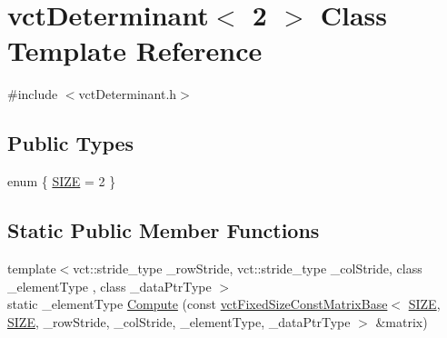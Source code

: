 \hypertarget{classvct_determinant_3_012_01_4}{\section{vct\-Determinant$<$ 2 $>$ Class Template Reference}
\label{classvct_determinant_3_012_01_4}
}


{\ttfamily \#include $<$vct\-Determinant.\-h$>$}

\subsection*{Public Types}
\begin{DoxyCompactItemize}
\item 
enum \{ \hyperlink{classvct_determinant_3_012_01_4_a9ed8f323cd2bc515f76a07c1eb7d7544aa4cda1b4da18f6d4c50329a98c60b934}{S\-I\-Z\-E} = 2
 \}
\end{DoxyCompactItemize}
\subsection*{Static Public Member Functions}
\begin{DoxyCompactItemize}
\item 
{\footnotesize template$<$vct\-::stride\-\_\-type \-\_\-row\-Stride, vct\-::stride\-\_\-type \-\_\-col\-Stride, class \-\_\-element\-Type , class \-\_\-data\-Ptr\-Type $>$ }\\static \-\_\-element\-Type \hyperlink{classvct_determinant_3_012_01_4_a2227410e9681c9649b728671fd9babbf}{Compute} (const \hyperlink{classvct_fixed_size_const_matrix_base}{vct\-Fixed\-Size\-Const\-Matrix\-Base}$<$ \hyperlink{classvct_determinant_3_012_01_4_a9ed8f323cd2bc515f76a07c1eb7d7544aa4cda1b4da18f6d4c50329a98c60b934}{S\-I\-Z\-E}, \hyperlink{classvct_determinant_3_012_01_4_a9ed8f323cd2bc515f76a07c1eb7d7544aa4cda1b4da18f6d4c50329a98c60b934}{S\-I\-Z\-E}, \-\_\-row\-Stride, \-\_\-col\-Stride, \-\_\-element\-Type, \-\_\-data\-Ptr\-Type $>$ \&matrix)
\end{DoxyCompactItemize}


